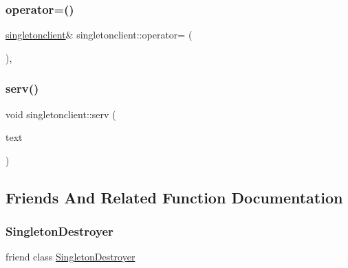 \mbox{\label{classsingletonclient_af382caa9600d2bdd8b746e4198d05bf9}} 
\subsubsection{\texorpdfstring{operator=()}{operator=()}}
{\footnotesize\ttfamily \mbox{\hyperlink{classsingletonclient}{singletonclient}}\& singletonclient\+::operator= (\begin{DoxyParamCaption}\item[{\mbox{\hyperlink{classsingletonclient}{singletonclient}} \&}]{ }\end{DoxyParamCaption})\hspace{0.3cm}{\ttfamily [protected]}, {\ttfamily [delete]}}

\mbox{\label{classsingletonclient_a86ecb62d0e64b7feadd803958e6b7343}} 
\subsubsection{\texorpdfstring{serv()}{serv()}}
{\footnotesize\ttfamily void singletonclient\+::serv (\begin{DoxyParamCaption}\item[{Q\+String}]{text }\end{DoxyParamCaption})\hspace{0.3cm}{\ttfamily [static]}}



\subsection{Friends And Related Function Documentation}
\mbox{\label{classsingletonclient_aa93ce997b9645496c0e17460fba08432}} 
\subsubsection{\texorpdfstring{Singleton\+Destroyer}{SingletonDestroyer}}
{\footnotesize\ttfamily friend class \mbox{\hyperlink{class_singleton_destroyer}{Singleton\+Destroyer}}\hspace{0.3cm}{\ttfamily [friend]}}



